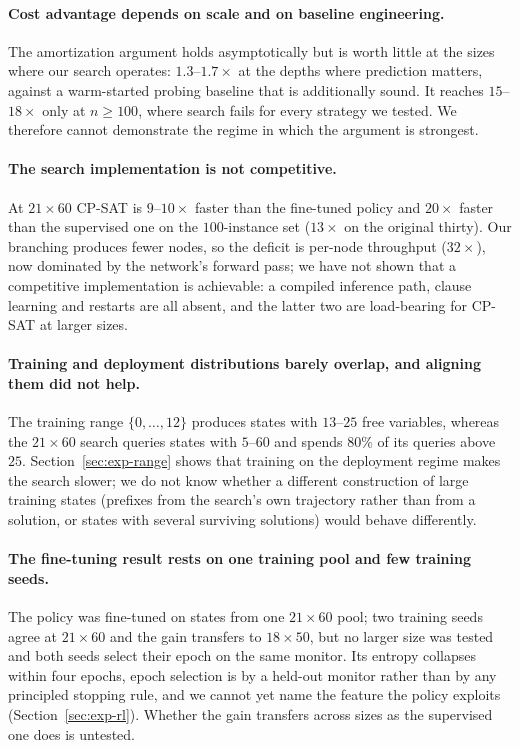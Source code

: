 \documentclass[final,5p,times,twocolumn]{elsarticle}
\begin{document}
\paragraph{Cost advantage depends on scale and on baseline engineering.} The amortization argument holds asymptotically but is worth little at the sizes where our search operates: $1.3$--$1.7\times$ at the depths where prediction matters, against a warm-started probing baseline that is additionally sound. It reaches $15$--$18\times$ only at $n\ge 100$, where search fails for every strategy we tested. We therefore cannot demonstrate the regime in which the argument is strongest.

\paragraph{The search implementation is not competitive.} At $21\times60$ CP-SAT is $9$--$10\times$ faster than the fine-tuned policy and $20\times$ faster than the supervised one on the $100$-instance set ($13\times$ on the original thirty). Our branching produces fewer nodes, so the deficit is per-node throughput ($32\times$), now dominated by the network's forward pass; we have not shown that a competitive implementation is achievable: a compiled inference path, clause learning and restarts are all absent, and the latter two are load-bearing for CP-SAT at larger sizes.

\paragraph{Training and deployment distributions barely overlap, and aligning them did not help.} The training range $\{0,\dots,12\}$ produces states with $13$--$25$ free variables, whereas the $21\times60$ search queries states with $5$--$60$ and spends $80\%$ of its queries above $25$. Section~\ref{sec:exp-range} shows that training on the deployment regime makes the search slower; we do not know whether a different construction of large training states (prefixes from the search's own trajectory rather than from a solution, or states with several surviving solutions) would behave differently.

\paragraph{The fine-tuning result rests on one training pool and few training seeds.} The policy was fine-tuned on states from one $21\times60$ pool; two training seeds agree at $21\times60$ and the gain transfers to $18\times50$, but no larger size was tested and both seeds select their epoch on the same monitor. Its entropy collapses within four epochs, epoch selection is by a held-out monitor rather than by any principled stopping rule, and we cannot yet name the feature the policy exploits (Section~\ref{sec:exp-rl}). Whether the gain transfers across sizes as the supervised one does is untested.
\end{document}

